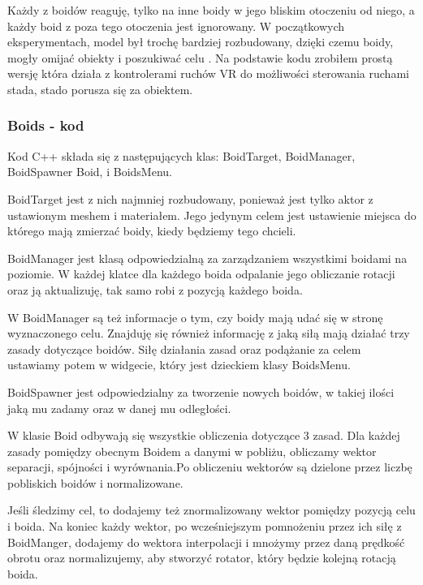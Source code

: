 \documentclass[a4paper,12pt,reqno]{article}
\begin{document}
Każdy z boidów reaguję, tylko na inne boidy w jego bliskim otoczeniu od niego, a każdy boid z poza tego otoczenia jest ignorowany. W początkowych eksperymentach, model był trochę bardziej rozbudowany, dzięki czemu boidy, mogły omijać obiekty i poszukiwać celu \cite{boids_reynolds}. Na podstawie kodu \cite{code_boids} zrobiłem prostą wersję która działa z kontrolerami ruchów VR do możliwości sterowania ruchami stada, stado porusza się za obiektem.

\subsubsection{Boids - kod}

Kod C++ składa się z następujących klas: BoidTarget, BoidManager, BoidSpawner Boid,  i BoidsMenu. 

BoidTarget jest z nich najmniej rozbudowany, ponieważ jest tylko aktor z ustawionym meshem i materiałem. Jego jedynym celem jest ustawienie miejsca do którego mają zmierzać boidy, kiedy będziemy tego chcieli.

BoidManager jest klasą odpowiedzialną za zarządzaniem wszystkimi boidami na poziomie. W każdej klatce dla każdego boida odpalanie jego obliczanie rotacji oraz ją aktualizuję, tak samo robi z pozycją każdego boida.



W BoidManager są też informacje o tym, czy boidy mają udać się w stronę wyznaczonego celu. Znajduję się również informację z jaką siłą mają działać trzy zasady dotyczące boidów. Siłę działania zasad oraz podążanie za celem ustawiamy potem w widgecie, który jest dzieckiem klasy BoidsMenu.

BoidSpawner jest odpowiedzialny za tworzenie nowych boidów, w takiej ilości jaką mu zadamy oraz w danej mu odległości.

W klasie Boid odbywają się wszystkie obliczenia dotyczące 3 zasad. Dla każdej zasady pomiędzy obecnym Boidem a danymi w pobliżu, obliczamy wektor separacji, spójności i wyrównania.Po obliczeniu wektorów są dzielone przez liczbę pobliskich boidów i normalizowane.



Jeśli śledzimy cel, to dodajemy też znormalizowany wektor pomiędzy pozycją celu i boida. Na koniec każdy wektor, po wcześniejszym pomnożeniu przez ich siłę z BoidManger, dodajemy do wektora interpolacji i mnożymy przez daną prędkość obrotu oraz normalizujemy, aby stworzyć rotator, który będzie kolejną rotacją boida.
\end{document}

